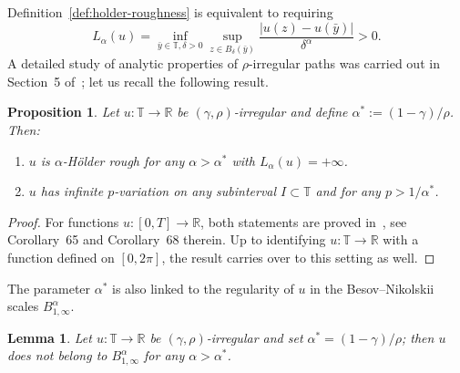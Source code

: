 \documentclass[11pt,oneside,reqno]{amsart}
\newcommand{\assign}{:=}
\newenvironment{enumeratealpha}{\begin{enumerate}[a{\textup{)}}] }{\end{enumerate}}
\newtheorem{lemma}[theorem]{Lemma}
\newtheorem{proposition}[theorem]{Proposition}
{\theoremstyle{remark}\newtheorem{remark}[theorem]{Remark}}
\numberwithin{equation}{section}
\begin{document}
Definition~\ref{def:holder-roughness} is equivalent to requiring
\begin{equation}
  L_{\alpha} (u) = \inf_{\bar{y} \in \mathbb{T}, \delta > 0} \sup_{z \in
  B_{\delta} (\bar{y})} \frac{| u (z) - u (\bar{y}) |}{\delta^{\alpha}} > 0.
\end{equation}
A detailed study of analytic properties of $\rho$-irregular paths was carried
out in Section~5 of~{\cite{galeati2020prevalence}}; let us recall the
following result.

\begin{proposition}
  Let $u : \mathbb{T} \rightarrow \mathbb{R}$ be $(\gamma, \rho)$-irregular
  and define $\alpha^{\ast} \assign (1 - \gamma) / \rho$. Then:
  \begin{enumeratealpha}
    \item $u$ is $\alpha$-H\"{o}lder rough for any $\alpha > \alpha^{\ast}$
    with $L_{\alpha} (u) = + \infty$.
    
    \item $u$ has infinite $p$-variation on any subinterval $I \subset
    \mathbb{T}$ and for any $p > 1 / \alpha^{\ast}$.
  \end{enumeratealpha}
\end{proposition}

\begin{proof}
  For functions $u : [0, T] \rightarrow \mathbb{R}$, both statements are
  proved in~{\cite{galeati2020prevalence}}, see Corollary~65 and Corollary~68
  therein. Up to identifying $u : \mathbb{T} \rightarrow \mathbb{R}$ with a
  function defined on $[0, 2 \pi]$, the result carries over to this setting as
  well.
\end{proof}

The parameter $\alpha^{\ast}$ is also linked to the regularity of $u$ in the
Besov--Nikolskii scales $B^{\alpha}_{1, \infty}$.

\begin{lemma}
  \label{lem:rho-irr-besov-nikolskii}Let $u : \mathbb{T} \rightarrow
  \mathbb{R}$ be $(\gamma, \rho)$-irregular and set $\alpha^{\ast} = (1 -
  \gamma) / \rho$; then $u$ does not belong to $B^{\alpha}_{1, \infty}$ for
  any $\alpha > \alpha^{\ast}$.
\end{lemma}
\end{document}
